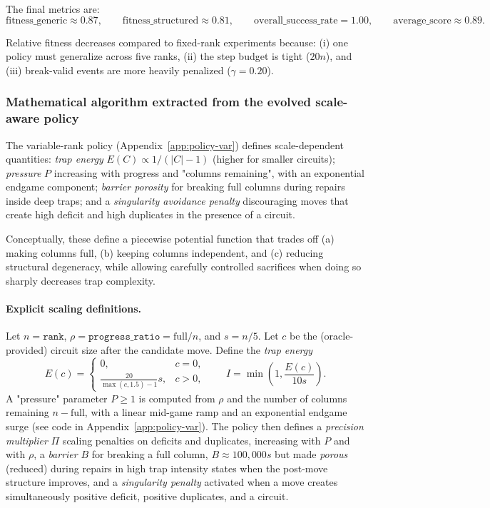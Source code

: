 \documentclass[11pt]{amsart}
\begin{document}
The final metrics are:
\[
\text{fitness\_generic}\approx 0.87,\qquad
\text{fitness\_structured}\approx 0.81,\qquad
\text{overall\_success\_rate}=1.00,\qquad
\text{average\_score}\approx 0.89.
\]

Relative fitness decreases compared to fixed-rank experiments because:
(i) one policy must generalize across five ranks, (ii) the step budget is tight ($20n$), and (iii) break-valid events are more heavily penalized ($\gamma=0.20$).

\subsubsection{Mathematical algorithm extracted from the evolved scale-aware policy}

The variable-rank policy (Appendix~\ref{app:policy-var}) defines scale-dependent quantities: \emph{trap energy} $E(C)\propto 1/(|C|-1)$ (higher for smaller circuits); \emph{pressure} $P$ increasing with progress and "columns remaining", with an exponential endgame component; \emph{barrier porosity} for breaking full columns during repairs inside deep traps; and a \emph{singularity avoidance penalty} discouraging moves that create high deficit and high duplicates in the presence of a circuit.

Conceptually, these define a piecewise potential function that trades off (a) making columns full, (b) keeping columns independent, and (c) reducing structural degeneracy, while allowing carefully controlled sacrifices when doing so sharply decreases trap complexity.



\paragraph{Explicit scaling definitions.}
Let $n=\texttt{rank}$, $\rho=\texttt{progress\_ratio}=\mathrm{full}/n$, and $s=n/5$.
Let $c$ be the (oracle-provided) circuit size after the candidate move.
Define the \emph{trap energy}
\[
E(c)=
\begin{cases}
0, & c=0,\\[2mm]
\displaystyle \frac{20}{\max(c,1.5)-1}s, & c>0,
\end{cases}
\qquad
I=\min\!\left(1,\frac{E(c)}{10s}\right).
\]
A "pressure" parameter $P\ge 1$ is computed from $\rho$ and the number of columns remaining $n-\mathrm{full}$, with a linear mid-game ramp and an exponential endgame surge (see code in Appendix~\ref{app:policy-var}).
The policy then defines a \emph{precision multiplier} $\Pi$ scaling penalties on deficits and duplicates, increasing with $P$ and with $\rho$, a \emph{barrier} $B$ for breaking a full column, $B\approx 100{,}000s$ but made \emph{porous} (reduced) during repairs in high trap intensity states when the post-move structure improves, and a \emph{singularity penalty} activated when a move creates simultaneously positive deficit, positive duplicates, and a circuit.
\end{document}
